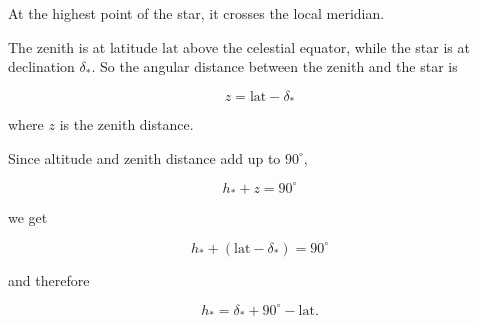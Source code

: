 At the highest point of the star, it crosses the local meridian.

The zenith is at latitude $\mathrm{lat}$ above the celestial equator, while the star is at declination $\delta_*$.  
So the angular distance between the zenith and the star is

\[
z = \mathrm{lat} - \delta_*
\]

where $z$ is the zenith distance.

Since altitude and zenith distance add up to $90^\circ$,

\[
h_* + z = 90^\circ
\]

we get

\[
h_* + (\mathrm{lat} - \delta_*) = 90^\circ
\]

and therefore

\[
h_* = \delta_* + 90^\circ - \mathrm{lat}.
\]